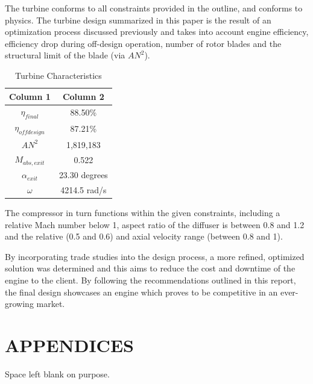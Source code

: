 \documentclass[12pt, letter]{report}
\renewcommand{\chaptername}{Section}           %
\begin{document}
The turbine conforms to all constraints provided in the outline, and conforms to physics. The turbine design summarized in this paper is the result of an optimization process discussed previously and takes into account engine efficiency, efficiency drop during off-design operation, number of rotor blades and the structural limit of the blade (via $AN^2$).

\begin{table}[htbp]
\centering
\begin{tabular}{|c|c|}
\hline
\textbf{Column 1} & \textbf{Column 2} \\ \hline
$\eta_{final}$ & 88.50\% \\ \hline
$\eta_{off design}$ & 87.21\% \\ \hline
$AN^2$ & 1,819,183 \\ \hline
$M_{abs,exit}$ & 0.522 \\ \hline
$\alpha_{exit}$ & 23.30 degrees \\ \hline
$\omega$ & 4214.5 rad/s \\ \hline
\end{tabular}
\caption{Turbine Characteristics}
\label{tab:turbine_characteristics}
\end{table}

The compressor in turn functions within the given constraints, including a relative Mach number below 1, aspect ratio of the diffuser is between 0.8 and 1.2 and the relative (0.5 and 0.6) and axial velocity range (between 0.8 and 1).

By incorporating trade studies into the design process, a more refined, optimized solution was determined and this aims to reduce the cost and downtime of the engine to the client. By following the recommendations outlined in this report, the final design showcases an engine which proves to be competitive in an ever-growing market. 

\clearpage


\pagebreak


\appendix
\chapter*{APPENDICES}
Space left blank on purpose.
\renewcommand{\chaptername}{Appendix} 
\end{document}
